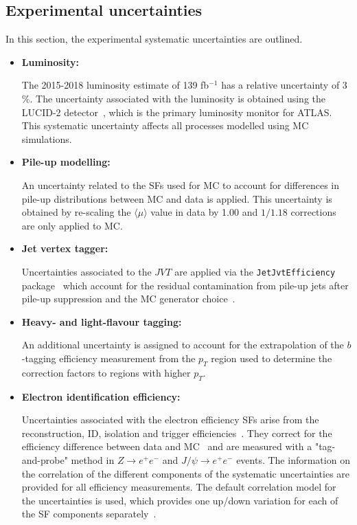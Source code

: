 \subsection{Experimental uncertainties}
\label{subsec:syst_exp}

In this section, the experimental systematic uncertainties are outlined.

\begin{itemize}
\item \textbf{Luminosity:}

The 2015-2018 luminosity estimate of 139 fb$^{-1}$ has a relative uncertainty of 3$\%$. The uncertainty associated with the luminosity is obtained using the LUCID-2 detector~\cite{Avoni:2018}, which is the primary luminosity monitor for ATLAS. This systematic uncertainty affects all processes modelled using MC simulations.


\item \textbf{Pile-up modelling:}

An uncertainty related to the SFs used for MC to account for differences in pile-up distributions between MC and data is applied. This uncertainty is obtained by re-scaling the $\langle \mu \rangle$ value in data by \num{1.00} and $1/1.18$ corrections are only applied to MC.


\item \textbf{Jet vertex tagger:}

Uncertainties associated to the $JVT$ are applied via the \texttt{JetJvtEfficiency} package~\cite{Tomiwa_2017} which account for the
residual contamination from pile-up jets after pile-up suppression and the MC generator choice~\cite{PERF-2016-06}.


\item \textbf{Heavy- and light-flavour tagging:}


An additional uncertainty is assigned to account for the extrapolation of the $b$-tagging efficiency measurement from the $p_{T}$ region used to determine the correction factors to regions with higher $p_{T}$.


\item \textbf{Electron identification efficiency:}

Uncertainties associated with the electron efficiency SFs arise from the reconstruction,
ID, isolation and trigger efficiencies~\cite{twiki-elSFunc}. They correct for the efficiency difference between data and MC~\cite{EGAM-2018-01}
and are measured with a "tag-and-probe" method in $Z\rightarrow e^{+}e^{-}$ and $J/\psi \rightarrow e^{+}e^{-}$ events. The information on the correlation of the different components of the systematic uncertainties are provided for all efficiency  measurements. The default correlation model for the uncertainties is used, which provides one up/down variation
for each of the SF components separately~\cite{twiki-elSFunc}.



\end{itemize}
